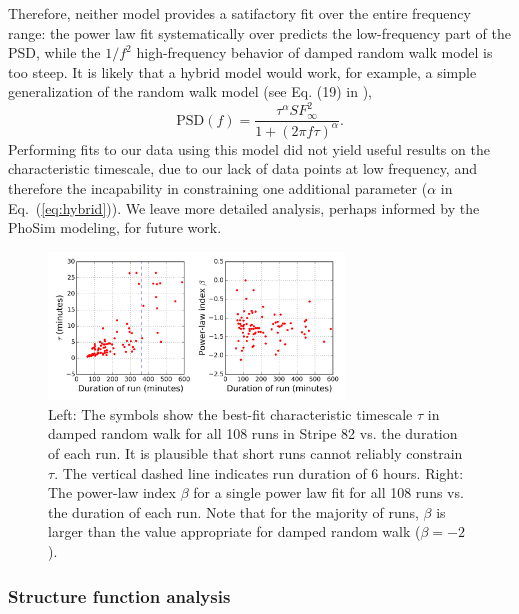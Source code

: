 Therefore, neither model provides a satifactory fit over the entire frequency range: 
the power law fit systematically over predicts the low-frequency part of the PSD,
while the $1/f^2$ high-frequency behavior of damped random walk model is too 
steep. It is likely that a hybrid model would work, for example, a simple
generalization of the random walk model
(see Eq. (19) in \cite{Dunkley2005}), 
\begin{equation}
\textrm{PSD}(f) = \frac{\tau^\alpha SF^2_{\infty}}{1+(2\pi f
  \tau)^\alpha}.
\label{eq:hybrid}
\end{equation}
Performing fits to our data using this model did not yield useful
results on the characteristic timescale, due to our lack of data
points at low frequency, and therefore the incapability in
constraining one additional parameter ($\alpha$ in Eq.~(\ref{eq:hybrid})).
We leave more detailed analysis,
perhaps informed by the PhoSim modeling, for future work. 


\begin{figure}[th]
\centering
\includegraphics[width=0.7\textwidth]{FIGURES/taubeta.png}
\vskip -0.2in
\caption{Left: The symbols show the best-fit characteristic timescale $\tau$ in 
damped random walk for all 108 runs in Stripe 82 vs. the duration of 
each run. It is plausible that short runs cannot reliably constrain
$\tau$.
The vertical dashed line indicates run duration of 6 hours.
Right: The power-law index $\beta$ for a single power law fit for all 108 
runs vs. the duration of each run. Note that for the majority of runs, $\beta$
is larger than the value appropriate for damped random walk ($\beta = -2$). 
\label{fig:hist}}
\end{figure}



\subsubsection{Structure function analysis} 


